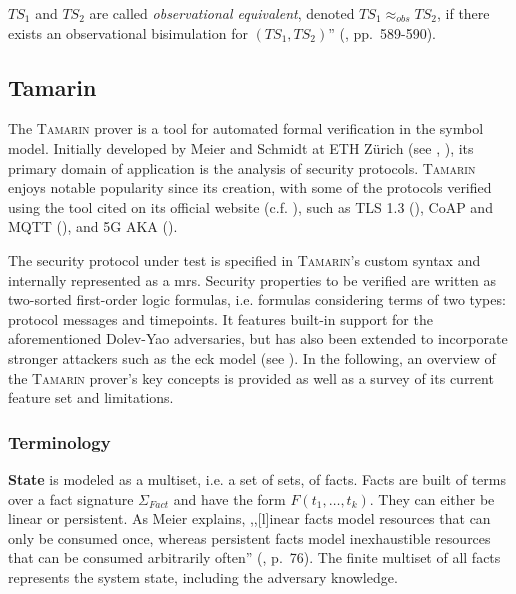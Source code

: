 \noindent
$TS_1$ and $TS_2$ are called \textit{observational equivalent}, denoted $TS_1 \approx_{obs} TS_2$, if there exists an observational bisimulation for $(TS_1, TS_2)$'' (\cite{baier2008principles}, pp.~589-590).

\subsection{Tamarin}
\label{ssec:tamarin}

The \textsc{Tamarin} prover is a tool for automated formal verification in the symbol model.
Initially developed by Meier and Schmidt at ETH Zürich (see \cite{schmidt2012formal}, \cite{meier2013advancing}), its primary domain of application is the analysis of security protocols.
\textsc{Tamarin} enjoys notable popularity since its creation, with some of the protocols verified using the tool cited on its official website (c.f. \cite{tamarin}), such as TLS 1.3 (\cite{cremers2017comprehensive}), CoAP and MQTT (\cite{kim2017automated}), and 5G AKA (\cite{basin2018formal}).

The security protocol under test is specified in \textsc{Tamarin}'s custom syntax and internally represented as a \gls{mrs}.
Security properties to be verified are written as two-sorted first-order logic formulas, i.e. formulas considering terms of two types: protocol messages and timepoints.
It features built-in support for the aforementioned Dolev-Yao adversaries, but has also been extended to incorporate stronger attackers such as the \gls{eck} model (see \cite{lamacchia2007stronger}).
In the following, an overview of the \textsc{Tamarin} prover's key concepts is provided as well as a survey of its current feature set and limitations.

\subsubsection{Terminology}

\textbf{State} is modeled as a multiset, i.e. a set of sets, of facts.
Facts are built of terms over a fact signature $\Sigma_{Fact}$ and have the form $F(t_1, \ldots, t_k)$.
They can either be linear or persistent.
As Meier explains, ,,[l]inear facts model resources that can only be consumed once, whereas persistent facts model inexhaustible resources that can be consumed arbitrarily often'' (\cite{meier2013advancing}, p.~76).
The finite multiset of all facts represents the system state, including the adversary knowledge.

